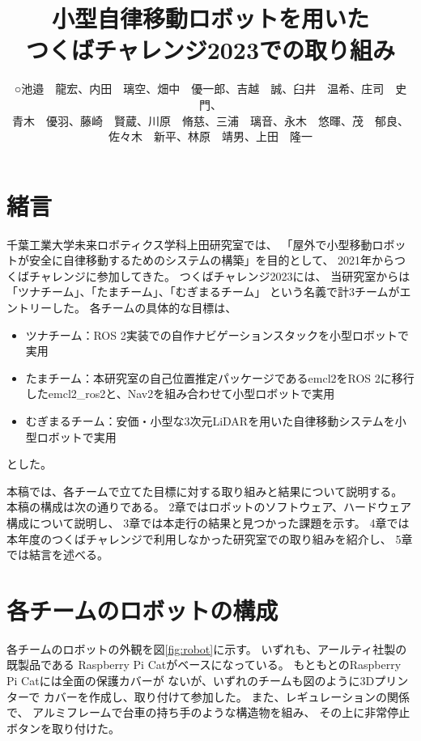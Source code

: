 \documentclass[twocolumn,9pt]{jsproceedings}
\title{小型自律移動ロボットを用いた\\つくばチャレンジ2023での取り組み}
\author{○池邉　龍宏\authorrefmark{2}、内田　璃空\authorrefmark{2}、畑中　優一郎\authorrefmark{2}、吉越　誠\authorrefmark{1}、臼井　温希\authorrefmark{1}、庄司　史門\authorrefmark{1}、
\\青木　優羽\authorrefmark{1}、藤崎　賢蔵\authorrefmark{1}、川原　脩慈\authorrefmark{1}、三浦　璃音\authorrefmark{1}、永木　悠暉\authorrefmark{1}、茂　郁良\authorrefmark{1}、
\\佐々木　新平\authorrefmark{1}、林原　靖男\authorrefmark{1}、上田　隆一\authorrefmark{1}}
\affiliation{千葉工業大学 未来ロボティクス学科 ツナチーム/たまチーム/むぎまるチーム}
\begin{document}
\maketitle


\section{緒言}

千葉工業大学未来ロボティクス学科上田研究室では、
「屋外で小型移動ロボットが安全に自律移動するためのシステムの構築」を目的として、
2021年からつくばチャレンジに参加してきた。
つくばチャレンジ2023には、
当研究室からは「ツナチーム」、「たまチーム」、「むぎまるチーム」
という名義で計3チームがエントリーした。
各チームの具体的な目標は、
\begin{itemize}
  \item ツナチーム：ROS 2\cite{ROS 2}実装での自作ナビゲーションスタックを小型ロボットで実用
  \item たまチーム：本研究室の自己位置推定パッケージであるemcl2\cite{emcl2}をROS 2に移行したemcl2\_ros2\cite{emcl2_ros2}と、Nav2を組み合わせて小型ロボットで実用
  \item むぎまるチーム：安価・小型な3次元LiDARを用いた自律移動システムを小型ロボットで実用
\end{itemize}
とした。


本稿では、各チームで立てた目標に対する取り組みと結果について説明する。
本稿の構成は次の通りである。
2章ではロボットのソフトウェア、ハードウェア構成について説明し、
3章では本走行の結果と見つかった課題を示す。
4章では本年度のつくばチャレンジで利用しなかった研究室での取り組みを紹介し、
5章では結言を述べる。

\section{各チームのロボットの構成}

各チームのロボットの外観を図\ref{fig:robot}に示す。
いずれも、アールティ社製の既製品である
Raspberry Pi Cat\cite{RTshop}がベースになっている。
もともとのRaspberry Pi Catには全面の保護カバーが
ないが、いずれのチームも図のように3Dプリンターで
カバーを作成し、取り付けて参加した。
また、レギュレーションの関係で、
アルミフレームで台車の持ち手のような構造物を組み、
その上に非常停止ボタンを取り付けた。
\end{document}
